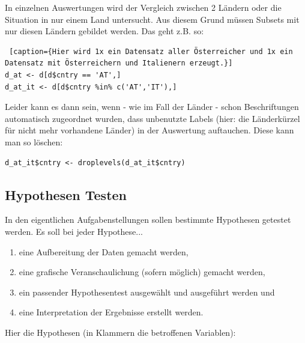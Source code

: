 \documentclass{article}
\begin{document}
In einzelnen Auswertungen wird der Vergleich zwischen 2 Ländern oder die Situation in nur einem Land untersucht. Aus diesem Grund müssen Subsets mit nur diesen Ländern gebildet werden. Das geht z.B. so: \\

 \begin{lstlisting} [caption={Hier wird 1x ein Datensatz aller Österreicher und 1x ein Datensatz mit Österreichern und Italienern erzeugt.}]
d_at <- d[d$cntry == 'AT',]
d_at_it <- d[d$cntry %in% c('AT','IT'),]
 \end{lstlisting}

Leider kann es dann sein, wenn - wie im Fall der Länder - schon Beschriftungen automatisch zugeordnet wurden, dass unbenutzte Labels (hier: die Länderkürzel für nicht mehr vorhandene Länder) in der Auswertung auftauchen. Diese kann man so löschen:

 \begin{lstlisting}
d_at_it$cntry <- droplevels(d_at_it$cntry) 
\end{lstlisting}


\subsection{Hypothesen Testen}

In den eigentlichen Aufgabenstellungen sollen bestimmte Hypothesen getestet werden. Es soll bei jeder Hypothese...
\begin{enumerate}
	\item eine Aufbereitung der Daten gemacht werden,
	\item eine grafische Veranschaulichung (sofern möglich) gemacht werden,
	\item ein passender Hypothesentest ausgewählt und ausgeführt werden und
	\item eine Interpretation der Ergebnisse erstellt werden.
\end{enumerate}

\newpage

Hier die Hypothesen (in Klammern die betroffenen Variablen):
\end{document}
